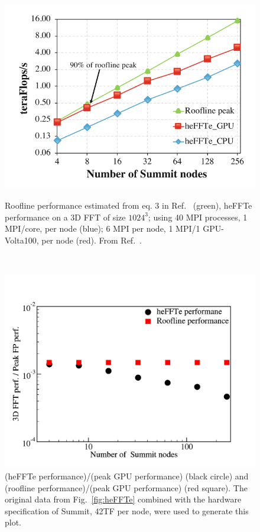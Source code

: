 \begin{figure}[ht]
    \centering
    \begin{minipage}[b]{.48\textwidth}
	\centering
    \includegraphics[width=0.99\linewidth]{figures/heFFTe.png}
    \caption{Roofline performance estimated from eq. 3 in Ref.~\cite{heFFTe2020} (green), heFFTe performance on a 3D FFT of size $1024^3$; using 40 MPI processes, 1 MPI/core, per node (blue); 6 MPI per node, 1 MPI/1 GPU-Volta100, per node (red). From Ref.~\cite{heFFTe2020}.}
    \label{fig:heFFTe}
    \end{minipage}
    ~
    \begin{minipage}[b]{.48\textwidth}
    \centering
    \includegraphics[width=0.99\linewidth]{figures/FFTPerfOnSummit.pdf}
    \caption{(heFFTe performance)/(peak GPU performance) (black circle) and (roofline performance)/(peak GPU performance) (red square). The original data from Fig.~\ref{fig:heFFTe} combined with the hardware specification of Summit, 42TF per node, were used to generate this plot.}
    \label{fig:heFFTeRel}
    \end{minipage}
\end{figure}


